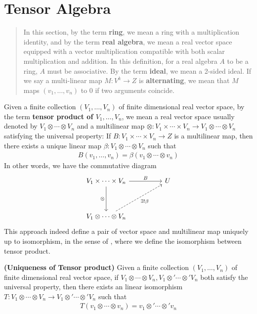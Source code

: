 \documentclass{report}
\begin{document}
\section{Tensor Algebra}
\begin{abstract}
In this section, by the term \textbf{ring}, we mean a ring with a multiplication identity, and by the term \textbf{real algebra}, we mean a real vector space equipped with a vector multiplication compatible with both scalar multiplication and addition. In this definition, for a real algebra $A$ to be a ring, $A$ must be associative.  By the term \textbf{ideal}, we mean a 2-sided ideal. If we say a multi-linear map $M:V^k\rightarrow Z$ is \textbf{alternating}, we mean that $M$ maps $(v_1,\dots ,v_n)$ to $0$ if two arguments coincide.
\end{abstract}
\begin{mdframed}
Given a finite collection $(V_1,\dots ,V_n)$ of finite dimensional real vector space, by the term \textbf{tensor product of $V_1,\dots ,V_n$}, we mean a real vector space  usually denoted by $V_1 \otimes \cdots \otimes  V_n$ and a multilinear map  $\otimes  : V_1 \times \cdots \times V_n \rightarrow V_1 \otimes  \cdots \otimes  V_n$ satisfying the universal property: If $B:V_1 \times \cdots \times V_n\rightarrow Z$ is a multilinear map, then there exists a unique linear map $\beta :V_1\otimes \cdots \otimes  V_n$ such that 
\begin{align*}
B(v_1,\dots ,v_n)=\beta (v_1\otimes \cdots \otimes  v_n)
\end{align*}
In other words, we have the commutative diagram
\[\begin{tikzcd}
	{V_1\times \cdots \times V_n} && U \\
	\\
	{V_1 \otimes \cdots \otimes   V_n}
	\arrow["B", from=1-1, to=1-3] 
	\arrow["{\otimes }"', from=1-1, to=3-1]
	\arrow["{\exists! \beta}"', dashed, from=3-1, to=1-3]
\end{tikzcd}\]
This approach indeed define a pair of vector space and multilinear map uniquely up to isomorphism, in the sense of , where we define the isomorphism between tensor product. 
\end{mdframed}
\begin{theorem}
\label{UoT}
\textbf{(Uniqueness of Tensor product)} Given a finite collection $(V_1,\dots, V_n)$ of finite dimensional real vector space, if $V_1 \otimes \cdots \otimes  V_n ,V_1\otimes  '\cdots \otimes  ' V_n$ both satisfy the universal property, then there exists an linear isomorphism $T:V_1 \otimes  \cdots \otimes  V_n \rightarrow V_1 \otimes' \cdots \otimes  ' V_n $ such that 
\begin{align*}
T(v_1\otimes  \cdots \otimes  v_n)=v_1 \otimes  '\cdots \otimes  'v_n
\end{align*}
\end{theorem}
\end{document}
